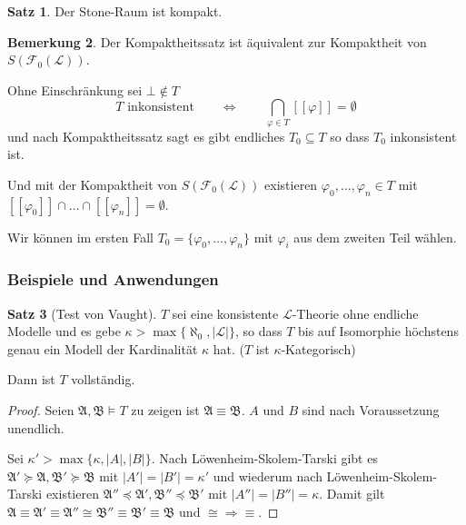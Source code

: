 \documentclass[12pt,parskip=full]{scrartcl}
\newcommand{\abs}[1]{{\left| #1 \right|}}
\theoremstyle{definition}
\newtheorem{theorem}{Satz}[section]
\newtheorem{remark}[theorem]{Bemerkung}
\begin{document}
	\begin{theorem}
		Der Stone-Raum ist kompakt.
	\end{theorem}

	\begin{remark}
		Der Kompaktheitssatz ist äquivalent zur Kompaktheit von $S(\mathcal{F}_0(\mathcal{L}))$.
		
		Ohne Einschränkung sei $\bot \notin T$
		\begin{equation*}
			T \text{ inkonsistent} \qquad\Leftrightarrow\qquad \bigcap_{\varphi \in T} [[\varphi]] = \emptyset
		\end{equation*}
		und nach Kompaktheitssatz sagt es gibt endliches $T_0 \subseteq T$ so dass $T_0$ inkonsistent ist.
		
		Und mit der Kompaktheit von $S(\mathcal{F}_0(\mathcal{L}))$ existieren $\varphi_0, \dots, \varphi_n \in T$ mit $[[\varphi_0]] \cap \dots \cap [[\varphi_n]] = \emptyset$.
		
		Wir können im ersten Fall $T_0 = \{ \varphi_0, \dots, \varphi_n \}$ mit $\varphi_i$ aus dem zweiten Teil wählen.
	\end{remark}

	\subsubsection{Beispiele und Anwendungen}
	
	\begin{theorem}[Test von Vaught]
		$T$ sei eine konsistente $\mathcal{L}$-Theorie ohne endliche Modelle und es gebe $\kappa > \max \{ \aleph_0, \abs{\mathcal{L}} \}$, so dass $T$ bis auf Isomorphie höchstens genau ein Modell der Kardinalität $\kappa$ hat. ($T$ ist $\kappa$-Kategorisch)
		
		Dann ist $T$ vollständig.
	\end{theorem}

	\begin{proof}
		Seien $\mathfrak{A}, \mathfrak{B} \models T$ zu zeigen ist $\mathfrak{A} \equiv \mathfrak{B}$. $A$ und $B$ sind nach Voraussetzung unendlich.
		
		Sei $\kappa' > \max \{ \kappa, \abs{A}, \abs{B} \}$. Nach Löwenheim-Skolem-Tarski gibt es $\mathfrak{A}' \succcurlyeq \mathfrak{A}, \mathfrak{B}' \succcurlyeq \mathfrak{B}$ mit $\abs{A'} = \abs{B'} = \kappa'$ und wiederum nach Löwenheim-Skolem-Tarski existieren $\mathfrak{A}'' \preccurlyeq \mathfrak{A}', \mathfrak{B}'' \preccurlyeq \mathfrak{B}'$ mit $\abs{A''} = \abs{B''} = \kappa$. Damit gilt $\mathfrak{A} \equiv \mathfrak{A}' \equiv \mathfrak{A}'' \cong \mathfrak{B}'' \equiv \mathfrak{B}' \equiv \mathfrak{B}$ und $\cong \Rightarrow \equiv$.
	\end{proof}
\end{document}
